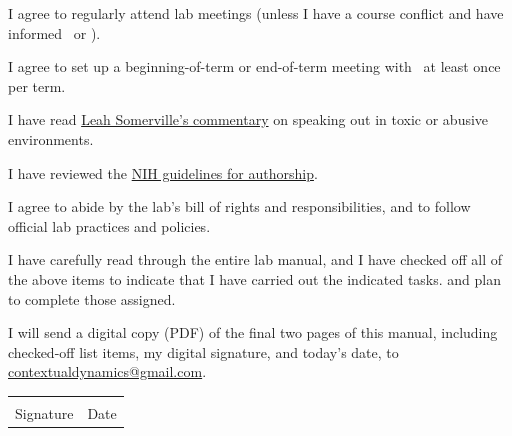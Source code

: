 \documentclass{tufte-book} %
\begin{document}
\begin{todolist}
  \item I agree to regularly attend lab meetings (unless I have a course
    conflict and have informed \director~or \coordinator).
  \item I agree to set up a beginning-of-term or end-of-term meeting
    with \director~at least once per term.
  \item I have read \href{https://www.sciencemag.org/careers/2018/11/what-can-we-learn-dartmouth}{Leah Somerville's commentary} on speaking
    out in toxic or abusive environments.
  \item I have reviewed the
    \href{https://oir.nih.gov/sites/default/files/uploads/sourcebook/documents/ethical_conduct/guidelines-authorship_contributions.pdf}{NIH
      guidelines for authorship}.
  \item I agree to abide by the lab's bill of rights and
    responsibilities, and to follow official lab practices and
    policies.
  \item I have carefully read through the entire lab manual, and I have
    checked off all of the above items to indicate that I have carried
    out the indicated tasks.
  and plan to complete those assigned.
  \item I will send a digital copy (PDF) of the final two pages of
    this manual, including checked-off list items, my digital
    signature, and today's date, to \href{mailto:contextualdynamics@gmail.com}{contextualdynamics@gmail.com}.
\end{todolist}

\vspace{1in}
\begin{tabular}{@{}p{3in}p{1in}@{}}
\hrulefill & \hrulefill \\
Signature & Date\\
\end{tabular}





\end{document}
